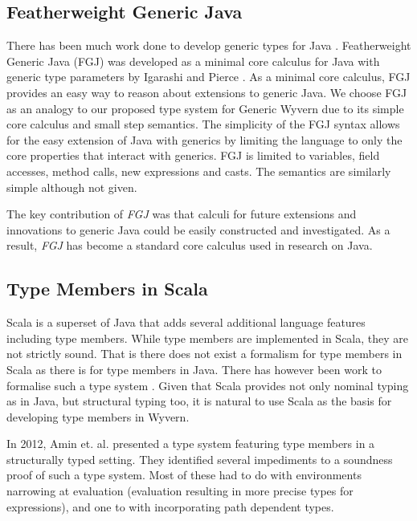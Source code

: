 \documentclass[11pt
              , a4paper
              , twoside
              , openright
              ]{report}
\numberwithin{case}{theorem}
\numberwithin{subcase}{case}
\begin{document}
\subsection{Featherweight Generic Java}
There has been much work done to develop generic types for Java \cite{agesen1997adding, Bracha:1998:MFS:286936.286957, Cartwright:1998:CGR:286936.286958, Odersky:1997:PJT:263699.263715, Bank:1997:PTJ:263699.263714}. Featherweight Generic Java (FGJ) was developed as a minimal core calculus for Java with generic type parameters by Igarashi and Pierce \cite{Igarashi:2001:FJM:503502.503505}. As a minimal core calculus, FGJ provides an easy way to reason about extensions to generic Java. We choose FGJ as an analogy to our proposed type system for Generic Wyvern due to its simple core calculus and small step semantics.
The simplicity of the FGJ syntax allows for the easy extension of Java with generics \cite{Potanin:2006:GOG:1167473.1167500, Zibin:2010:OIG:1932682.1869509} by limiting the language to only the core properties that interact with generics. FGJ is limited to variables, field accesses, method calls, new expressions and casts. The semantics are similarly simple although not given. 

The key contribution of \emph{FGJ} was that calculi for future extensions and innovations to generic Java could be easily constructed and investigated. As a result, \emph{FGJ} has become a standard core calculus used in research on Java.

\subsection{Type Members in Scala}
Scala \cite{scaladocs2016} is a superset of Java that adds several additional language features including type members. While type members are implemented in Scala, they are not strictly sound. That is there does not exist a formalism for type members in Scala as there is for type members in Java. There has however been work to formalise such a type system \cite{Amin:2014:FPT:2660193.2660216,amin:fool:2012}. Given that Scala provides not only nominal typing as in Java, but structural typing too, it is natural to use Scala as the basis for developing type members in Wyvern.

In 2012, Amin et. al. \cite{amin:fool:2012} presented a type system featuring type members in a structurally typed setting. They identified several impediments to a soundness proof of such a type system. Most of these had to do with environments narrowing at evaluation (evaluation resulting in more precise types for expressions), and one to with incorporating path dependent types. 
\end{document}
